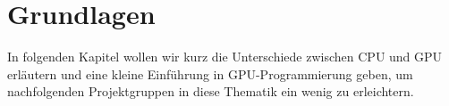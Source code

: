 \chapter{Grundlagen}
\begin{Spacing}{\mylinespace}

In folgenden Kapitel wollen wir kurz die Unterschiede zwischen CPU und GPU erläutern und eine kleine Einführung in GPU-Programmierung geben, um nachfolgenden Projektgruppen in diese Thematik ein wenig zu erleichtern.
\end{Spacing}




\clearpage
